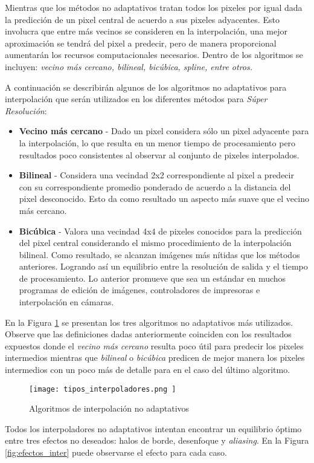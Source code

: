 Mientras que los métodos no adaptativos tratan todos los pixeles por igual
dada la predicción de un pixel central de acuerdo a sus pixeles adyacentes. Esto 
involucra que entre más vecinos se consideren en la interpolación, una mejor 
aproximación se tendrá del pixel a predecir, pero de manera proporcional 
aumentarán los recursos computacionales necesarios. Dentro de los algoritmos 
se incluyen: \emph{vecino más cercano, bilineal, bicúbica, spline, entre otros.}

A continuación se describirán algunos de los algoritmos no adaptativos para 
interpolación que serán utilizados en los diferentes métodos para \emph{Súper
Resolución}:
\begin{itemize}
    \item \textbf{Vecino más cercano} - Dado un pixel considera sólo un pixel 
    adyacente para la interpolación, lo que resulta en un menor tiempo de procesamiento
    pero resultados poco consistentes al observar al conjunto de pixeles interpolados. 
    \item \textbf{Bilineal} - Considera una vecindad 2x2 correspondiente al pixel
    a predecir con su correspondiente promedio ponderado de acuerdo a la distancia
    del pixel desconocido. Esto da como resultado un aspecto más suave que el vecino
    más cercano. 
    \item \textbf{Bicúbica} - Valora una vecindad 4x4 de pixeles conocidos para la
    predicción del pixel central considerando el mismo procedimiento de la 
    interpolación bilineal. Como resultado, se alcanzan imágenes más nítidas que los 
    métodos anteriores. Logrando así un equilibrio entre la resolución de salida y el 
    tiempo de procesamiento. Lo anterior promueve que sea un estándar en muchos programas
    de edición de imágenes, controladores de impresoras e interpolación en cámaras. 
\end{itemize}

En la Figura \ref{fig:interpoladores} se presentan los tres algoritmos no adaptativos
más utilizados. Observe que las definiciones dadas anteriormente coinciden con los 
resultados expuestos donde el \emph{vecino más cercano} resulta poco útil para
predecir los pixeles intermedios mientras que \emph{bilineal} o \emph{bicúbica}
predicen de mejor manera los pixeles intermedios con un poco más de detalle para
en el caso del último algoritmo. 
 
\begin{figure}[H]
    \texttt{[image:  tipos\_interpoladores.png ]}
    \centering
    \caption{ Algoritmos de interpolación no adaptativos }
    \label{fig:interpoladores}
\end{figure}
Todos los interpoladores no adaptativos intentan encontrar un equilibrio óptimo
entre tres efectos no deseados: halos de borde, desenfoque y \emph{aliasing}. En la 
Figura \ref{fig:efectos_inter} puede observarse el efecto para cada caso. 

